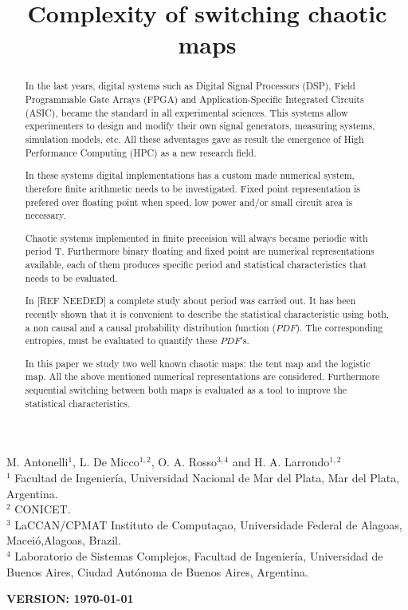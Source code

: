 \begin{frontmatter}

	\title{Complexity of switching chaotic maps}
	M. Antonelli$^{1}$, L. De Micco$^{1,2}$, O. A. Rosso$^{3,4}$ and H. A. Larrondo$^{1,2}$\\
	$^{1}$ Facultad de Ingenier\'ia, Universidad Nacional de Mar del Plata, Mar del Plata, Argentina.\\
	$^{2}$ CONICET.\\
	$^{3}$ LaCCAN/CPMAT Instituto de Computa\c{c}ao, Universidade Federal de Alagoas, Macei\'o,Alagoas, Brazil.\\
	$^{4}$ Laboratorio de Sistemas Complejos, Facultad de
	Ingenier\'ia, Universidad de Buenos Aires, Ciudad Aut\'onoma de
	Buenos Aires, Argentina.\\

\begin{abstract}
In the last years, digital systems such as Digital Signal Processors (DSP), Field Programmable Gate Arrays (FPGA) and Application-Specific Integrated Circuits (ASIC), became the standard in all experimental sciences.
This systems allow experimenters to design and modify their own signal generators, measuring systems, simulation models, etc.
All these adventages gave as result the emergence of High Performance Computing (HPC) as a new research field.


In these systems digital implementations has a custom made numerical system, therefore finite arithmetic needs to be investigated.
Fixed point representation is prefered over floating point when  speed, low power and/or small circuit area is necessary.

Chaotic systems implemented in finite preceision will always became periodic with period T.
Furthermore binary floating and fixed point are numerical representations available, each of them produces specific period and statistical characteristics that needs to be evaluated.

In [REF NEEDED] a complete study about period was carried out.
It has been recently shown that it is convenient to describe the statistical characteristic using both, a non causal and a causal probability distribution function ($PDF$).
The corresponding entropies, must be evaluated to quantify these $PDF$'s.  

In this paper we study two well known chaotic maps: the tent map and the logistic map.
All the above mentioned numerical representations are considered.
Furthermore sequential switching between both maps is evaluated as a tool to improve the statistical characteristics.

\end{abstract}
\maketitle
\end{frontmatter}
{\bf VERSION: \today}